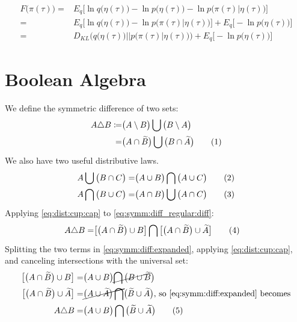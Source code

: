 \documentclass[]{article}
\newcommand\numberthis{\addtocounter{equation}{1}\tag{\theequation}}
\newcommand{\stcomp}[1]{\widetilde{#1}}
\begin{document}
\begin{appendices}
\begin{align*}
	F\big(\pi(\tau)\big) =& E_q\big[\ln q\big(\eta(\tau)\big) - \ln p\big(\eta(\tau)\big) - \ln p\big(\pi(\tau)\vert\eta(\tau)\big)\big]\\
	=& E_q\big[\ln q\big(\eta(\tau)\big)  - \ln p\big(\pi(\tau)\vert\eta(\tau)\big)\big] +  E_q\big[- \ln p\big(\eta(\tau)\big)\big]\\
	=& D_{KL}\big(q\big(\eta(\tau)\big)\vert\vert p\big(\pi(\tau)\vert\eta(\tau)\big)\big)+  E_q\big[- \ln p\big(\eta(\tau)\big)\big]
\end{align*}	
	\section{Boolean Algebra}
	We define the symmetric difference of two sets:
	\begin{align*}
		A \triangle B \coloneqq& \big(A \setminus B\big) \bigcup \big(B \setminus  A\big)\\
		=& \big(A \cap \stcomp{B}\big) \bigcup \big(B \cap \stcomp{A}\big) \numberthis \label{eq:symm:diff_regular:diff}\\
	\end{align*}
	We also have two useful distributive laws.
	\begin{align*}
		A \bigcup \big(B \cap C \big) =& \big(A \cup B\big) \bigcap  \big(A \cup C\big) \numberthis \label{eq:dist:cup:cap}\\
		A \bigcap \big(B \cup C \big) =& \big(A \cap B\big) \bigcup  \big(A \cap C\big)	\numberthis \label{eq:dist:cap:cup}	
	\end{align*}
	Applying \eqref{eq:dist:cup:cap} to \eqref{eq:symm:diff_regular:diff}:
	\begin{align*}
		A \triangle B =&\big[\big(A \cap \stcomp{B}\big) \cup B\big] \bigcap \big[ \big(A \cap \stcomp{B}\big) \cup \stcomp A \big] \numberthis \label{eq:symm:diff:expanded}
	\end{align*}
	Splitting the two terms in \eqref{eq:symm:diff:expanded}, applying \eqref{eq:dist:cup:cap}, and canceling intersections with the universal set:
	\begin{align*}
		\big[\big(A \cap \stcomp{B}\big) \cup B\big] =& \big(A \cup B\big) \cancel{\bigcap \big(B \cup \stcomp{B}}\big)\\
		\big[ \big(A \cap \stcomp{B}\big) \cup \stcomp A \big] =& \cancel{\big(A\cup\stcomp{A} \big) \bigcap} \big(\stcomp{B} \cup\stcomp{A}\big) \text{, so \eqref{eq:symm:diff:expanded} becomes}\\
		A \triangle B =& \big(A \cup B\big) \bigcap \big(\stcomp{B} \cup\stcomp{A}\big) \numberthis \label{eq:symm:diff:without:diff}
	\end{align*}


\end{appendices}
\end{document}
